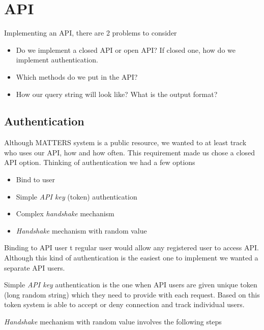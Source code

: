 	\section{API}
			
			Implementing an API, there are 2 problems to consider
			\begin{itemize}
				\item
					Do we implement a closed API or open API? 
					If closed one, how do we implement authentication.
				\item
					Which methods do we put in the API?
				\item
					How our query string will look like? 
					What is the output format?
			\end{itemize}
			
			\subsection{Authentication}
				
				Although MATTERS system is a public resource, 
				we wanted to at least track who uses our API, how and how often. 
				This requirement made us chose a closed API option. 
				Thinking of authentication we had a few options
				
				\begin{itemize}
					\item
						Bind to user
					\item
						Simple \emph{API key} (token) authentication
					\item
						Complex \emph{handshake} mechanism					
					\item
						\emph{Handshake} mechanism with random value
				\end{itemize}
				
				Binding to API user t regular user would allow any registered user to access API. 
				Although this kind of authentication is the easiest one to implement we wanted a separate API users.
				
				Simple  \emph{API key} authentication is the one when API users are given unique token 
				(long random string) which they need to provide with each request. 
				Based on this token system is able to accept or deny connection and track individual users.
				
				\emph{Handshake} mechanism with random value involves the following steps
				

